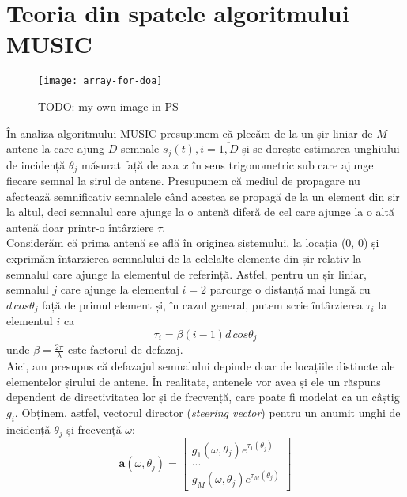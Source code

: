 
\section{Teoria din spatele algoritmului MUSIC}
\label{sec:theory-music}

\begin{figure}[h]
    \centering
    \texttt{[image: array-for-doa]}
    \caption{TODO: my own image in PS}
    \label{fig:array-for-doa}
\end{figure}


În analiza algoritmului MUSIC presupunem că plecăm de la un șir liniar de $M$
antene la care ajung $D$ semnale $s_j(t), i = \overline{1, D}$ și se dorește
estimarea unghiului de incidență $\theta_j$ măsurat față de axa $x$ în sens
trigonometric sub care ajunge fiecare semnal la șirul de antene. Presupunem că
mediul de propagare nu afectează semnificativ semnalele când acestea se propagă
de la un element din șir la altul, deci semnalul care ajunge la o antenă diferă
de cel care ajunge la o altă antenă doar printr-o întârziere $\tau$. \\

Considerăm că prima antenă se află în originea sistemului, la locația (0, 0) și
exprimăm întarzierea semnalului de la celelalte elemente din șir relativ la
semnalul care ajunge la elementul de referință. Astfel, pentru un șir liniar,
semnalul $j$ care ajunge la elementul $i = 2$ parcurge o distanță mai lungă cu
$d\,cos\theta_j$ față de primul element și, în cazul general, putem scrie
întârzierea $\tau_i$ la elementul $i$ ca
\begin{equation}
    \tau_i = \beta(i-1)d\,cos\theta_j
\end{equation}
unde $\beta = \frac{2\pi}{\lambda}$ este factorul de defazaj. \\

Aici, am presupus că defazajul semnalului depinde doar de locațiile distincte
ale elementelor șirului de antene. În realitate, antenele vor avea și ele un
răspuns dependent de directivitatea lor și de frecvență, care poate fi modelat
ca un câștig $g_i$. Obținem, astfel, vectorul director (\textit{steering
vector}) pentru un anumit unghi de incidență $\theta_j$ și frecvență $\omega$:
\begin{equation}
    \bm{a}(\omega, \theta_j) = 
	    \begin{bmatrix}
		g_1(\omega, \theta_j)e^{\tau_1(\theta_j)} \\
		... \\
		g_M(\omega, \theta_j)e^{\tau_M(\theta_j)}
	    \end{bmatrix}
\end{equation}

